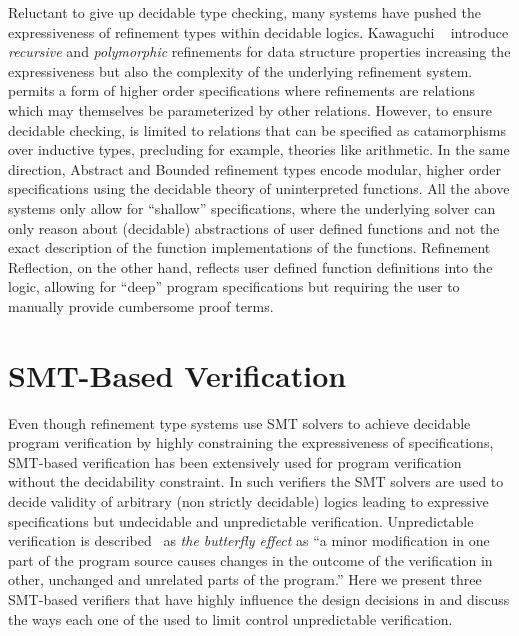 
Reluctant to give up decidable type checking, 
many systems have pushed the expressiveness of refinement types
within decidable logics. 
%
Kawaguchi \etal~\cite{LiquidPLDI09} 
introduce \emph{recursive} and \emph{polymorphic} refinements for data
structure properties increasing the expressiveness but also the complexity 
of the underlying refinement system. 
%
\catalyst~\citep{catalyst} permits a form of
higher order specifications where refinements
are relations which may themselves be parameterized
by other relations.
%
However, to ensure decidable checking, \catalyst
is limited to relations that can be specified as
catamorphisms over inductive types, precluding
for example, theories like arithmetic.
%
In the same direction, Abstract and Bounded refinement types 
encode modular, higher order specifications 
using the decidable theory of uninterpreted functions. 
% 
All the above systems
only allow for ``shallow'' specifications, 
where the underlying solver can only reason about 
(decidable) abstractions of user defined functions 
and not the exact description of the function  implementations of the functions. 
%
Refinement Reflection, on the other hand, 
reflects user defined function definitions 
into the logic, allowing for ``deep'' program specifications
but requiring the user to manually provide cumbersome proof terms. 



\section{SMT-Based Verification}\label{related:smtbased}

Even though refinement type systems use SMT solvers to 
achieve decidable program verification by highly constraining the 
expressiveness of specifications,
%
SMT-based verification has been extensively used for program verification 
without the decidability constraint. 
%
In such verifiers the SMT solvers are used to decide validity of 
arbitrary (\ie non strictly decidable) logics leading to expressive specifications
but undecidable and unpredictable verification. 
Unpredictable verification is described~\cite{Leino16}
as \textit{the butterfly effect} as ``a minor modification in one
part of the program source causes changes in the outcome of the verification in other,
unchanged and unrelated parts of the program.''
%
Here we present three SMT-based verifiers that have highly influence 
the design decisions in \toolname 
and discuss the ways each one of the used to limit control unpredictable verification. 



